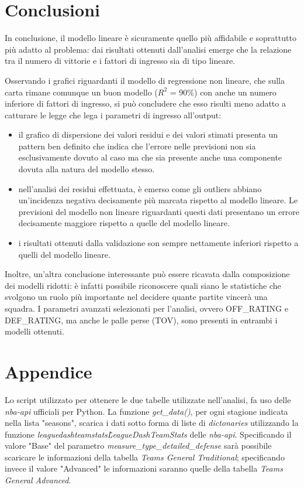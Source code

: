 \documentclass[11pt,a4paper]{article}
\begin{document}
\section{Conclusioni}
In conclusione, il modello lineare è sicuramente quello più affidabile e soprattutto più adatto al problema: dai risultati ottenuti dall'analisi emerge che la relazione tra il numero di vittorie e i fattori di ingresso sia di tipo lineare. 

Osservando i grafici riguardanti il modello di regressione non lineare, che sulla carta rimane comunque un buon modello ($R^2$ = 90\%) con anche un numero inferiore di fattori di ingresso, si può concludere che esso risulti meno adatto a catturare le legge che lega i parametri di ingresso all'output:

\begin{itemize}
    \item il grafico di dispersione dei valori residui e dei valori stimati presenta un pattern ben definito che indica che l'errore nelle previsioni non sia esclusivamente dovuto al caso ma che sia presente anche una componente dovuta alla natura del modello stesso.
    \item nell'analisi dei residui effettuata, è emerso come gli outliers abbiano un'incidenza negativa decisamente più marcata rispetto al modello lineare. 
    Le previsioni del modello non lineare riguardanti questi dati presentano un errore decisamente maggiore rispetto a quelle del modello lineare.
    \item i risultati ottenuti dalla validazione son sempre nettamente inferiori rispetto a quelli del modello lineare.
\end{itemize}

Inoltre, un'altra conclusione interessante può essere ricavata dalla composizione dei modelli ridotti: è infatti possibile riconoscere quali siano le statistiche che svolgono un ruolo più importante nel decidere quante partite vincerà una squadra. I parametri avanzati selezionati per l'analisi, ovvero OFF\_RATING e DEF\_RATING, ma anche le palle perse (TOV), sono presenti in entrambi i modelli ottenuti.

\newpage
\appendix
\section{Appendice}
 Lo script utilizzato per ottenere le due tabelle utilizzate nell'analisi, fa uso delle \emph{nba-api} ufficiali per Python.
 La funzione \emph{get\_data()}, per ogni stagione indicata nella lista "seasons", scarica i dati sotto forma di liste di \emph{dictonaries} utilizzando la funzione \emph{leaguedashteamstats\.LeagueDashTeamStats} delle \emph{nba-api}. Specificando il valore "Base" del parametro \emph{measure\_type\_detailed\_defense} sarà possibile scaricare le informazioni della tabella \emph{Teams General Traditional}; specificando invece il valore "Advanced" le informazioni saranno quelle della tabella \emph{Teams General Advanced}.
 
\end{document}

